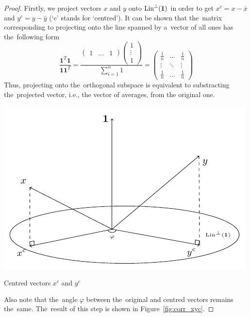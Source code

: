 \begin{proof}
Firstly, we project vectors $x$ and $y$ onto $\operatorname{Lin}^{\perp}(\mathbf{1})$
in order to get $x^c = x - \bar x$ and $y^c = y - \bar y$ (`c' stands for `centred').
It can be shown that the~matrix corresponding to projecting onto the line spanned by
a~vector of all ones has the~following form
\[
\frac{\mathbf{1}^T \mathbf{1}}{\mathbf{1} \mathbf{1}^T} = \frac{\begin{pmatrix} 1 & \ldots & 1 \end{pmatrix} \begin{pmatrix} 1 \\ \vdots \\ 1 \end{pmatrix}}{\sum_{i=1}^n 1} = \begin{pmatrix} \frac{1}{n} & \ldots & \frac{1}{n} \\ \vdots & \ddots & \vdots \\ \frac{1}{n} & \ldots & \frac{1}{n} \end{pmatrix}
\]
Thus, projecting onto the~orthogonal subspace is equivalent to
substracting the~projected vector, i.e., the vector of averages, from the original one.

\begin{marginfigure}
\includegraphics[scale=0.65]{figures/02_correlation_constant_centered_variables.pdf}
\caption{Centred vectors $x^c$ and $y^c$}
\label{fig:corr_xyc}
\end{marginfigure}

Also note that the~angle $\varphi$ between the~original and centred vectors remains the~same.
The~result of this step is shown in Figure~\ref{fig:corr_xyc}.


\end{proof}
